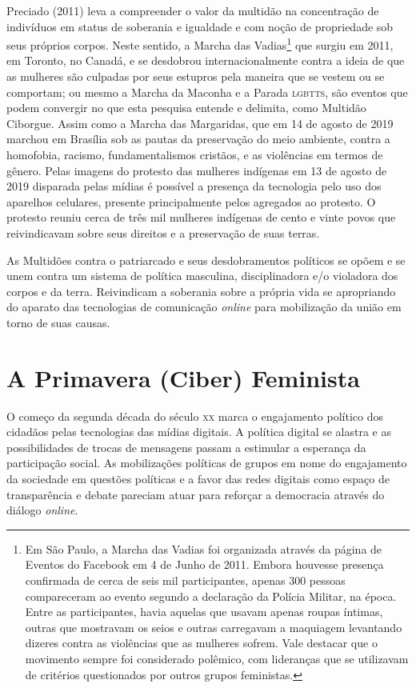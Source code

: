 Preciado (2011) leva a compreender o valor da multidão na concentração
de indivíduos em status de soberania e igualdade e com noção de
propriedade sob seus próprios corpos. Neste sentido, a Marcha das
Vadias\footnote{Em São Paulo, a Marcha das Vadias foi organizada através
  da página de Eventos do Facebook em 4 de Junho de 2011. Embora
  houvesse presença confirmada de cerca de seis mil participantes,
  apenas 300 pessoas compareceram ao evento segundo a declaração da
  Polícia Militar, na época. Entre as participantes, havia aquelas que
  usavam apenas roupas íntimas, outras que mostravam os seios e outras
  carregavam a maquiagem levantando dizeres contra as violências que as
  mulheres sofrem. Vale destacar que o movimento sempre foi considerado
  polêmico, com lideranças que se utilizavam de critérios questionados
  por outros grupos feministas.} que surgiu em 2011, em Toronto, no
Canadá, e se desdobrou internacionalmente contra a ideia de que as
mulheres são culpadas por seus estupros pela maneira que se vestem ou se
comportam; ou mesmo a Marcha da Maconha e a Parada \textsc{lgbtts}, são eventos
que podem convergir no que esta pesquisa entende e delimita, como
Multidão Ciborgue. Assim como a Marcha das Margaridas, que em 14 de
agosto de 2019 marchou em Brasília sob as pautas da preservação do meio
ambiente, contra a homofobia, racismo, fundamentalismos cristãos, e as
violências em termos de gênero. Pelas imagens do protesto das mulheres
indígenas em 13 de agosto de 2019 disparada pelas mídias é possível a
presença da tecnologia pelo uso dos aparelhos celulares, presente
principalmente pelos agregados ao protesto. O protesto reuniu cerca de
três mil mulheres indígenas de cento e vinte povos que reivindicavam
sobre seus direitos e a preservação de suas terras.

As Multidões contra o patriarcado e seus desdobramentos políticos se
opõem e se unem contra um sistema de política masculina, disciplinadora
e/o violadora dos corpos e da terra. Reivindicam a soberania sobre a
própria vida se apropriando do aparato das tecnologias de comunicação
\emph{online} para mobilização da união em torno de suas causas.

\section{A Primavera (Ciber) Feminista}

O começo da segunda década do século \textsc{xx} marca o engajamento político dos
cidadãos pelas tecnologias das mídias digitais. A política digital se
alastra e as possibilidades de trocas de mensagens passam a estimular a
esperança da participação social. As mobilizações políticas de grupos em
nome do engajamento da sociedade em questões políticas e a favor das
redes digitais como espaço de transparência e debate pareciam atuar para
reforçar a democracia através do diálogo \emph{online}.

